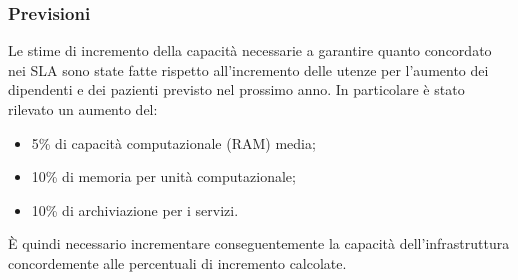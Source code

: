 \subsubsection{Previsioni}
	Le stime di incremento della capacità necessarie a garantire quanto concordato nei SLA sono state fatte rispetto all’incremento delle utenze per l'aumento dei dipendenti e dei pazienti previsto nel prossimo anno.
In particolare è stato rilevato un aumento del:
\begin{itemize}
	\item 5\% di capacità computazionale (RAM) media;
	\item 10\% di memoria per unità computazionale;
	\item 10\% di archiviazione per i servizi.
\end{itemize}
È quindi necessario incrementare conseguentemente la capacità dell’infrastruttura
concordemente alle percentuali di incremento calcolate.


